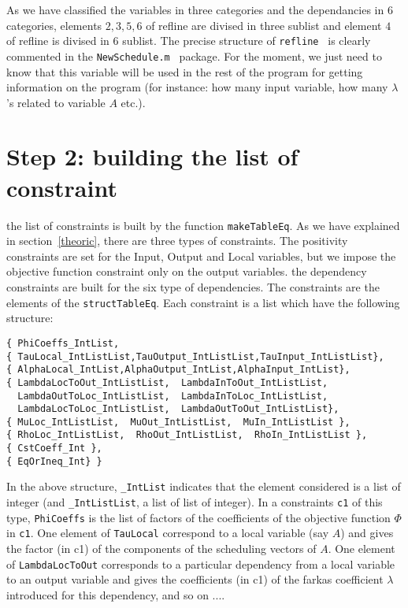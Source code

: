 \begin{itemize}
As we have classified the variables in three categories and
the dependancies in 6 categories, elements $2,3,5,6$ of refline are
divised in three sublist and element $4$ of refline is divised in 6
sublist.  The precise structure of {\tt refline } is clearly commented
in the {\tt NewSchedule.m } package.  For the moment, we just  need to 
know that this variable will be used in the rest of the program for 
getting information on the program (for instance: how many input variable, 
how many $\lambda$'s related to variable $A$ etc.).

\end{itemize}

\section{Step 2: building the list of constraint}
the list of constraints is built by the function {\tt makeTableEq}.
As we have explained in section~\ref{theoric}, there are three types
of constraints. The positivity constraints are set for the Input,
Output and Local variables, but we impose the objective function
constraint only on the output variables. the dependency constraints
are built for the six type of dependencies. The constraints are the
elements of the {\tt structTableEq}. Each constraint is a list which
have the following structure: \\
\begin{verbatim}
{ PhiCoeffs_IntList,
{ TauLocal_IntListList,TauOutput_IntListList,TauInput_IntListList},
{ AlphaLocal_IntList,AlphaOutput_IntList,AlphaInput_IntList},
{ LambdaLocToOut_IntListList,  LambdaInToOut_IntListList,
  LambdaOutToLoc_IntListList,  LambdaInToLoc_IntListList,
  LambdaLocToLoc_IntListList,  LambdaOutToOut_IntListList},
{ MuLoc_IntListList,  MuOut_IntListList,  MuIn_IntListList },
{ RhoLoc_IntListList,  RhoOut_IntListList,  RhoIn_IntListList },
{ CstCoeff_Int },
{ EqOrIneq_Int} }
\end{verbatim}
In the above structure, {\tt \_IntList} indicates that the element considered
is a list of integer (and {\tt \_IntListList}, a list of list of integer). 
In a constraints {\tt c1} of this type, 
{\tt PhiCoeffs} is the list of factors of the 
coefficients of the objective function $\Phi$ in {\tt c1}.
 One element of {\tt TauLocal} correspond to a local variable (say $A$) 
and gives the factor (in c1)  of the components 
of the scheduling vectors of $A$. 
One element of {\tt LambdaLocToOut} corresponds to a particular 
dependency from a local variable to
 an output variable and gives the coefficients (in c1)
 of the  farkas coefficient $\lambda$ introduced for this dependency,
 and so on .... 

